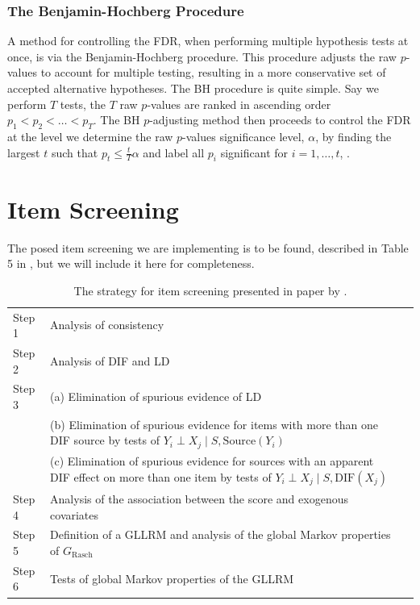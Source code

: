 \documentclass[a4project,12pt]{article}
\theoremstyle{examplestyle}
\theoremstyle{defstyle}
\theoremstyle{thmstyle}
\begin{document}
\subsubsection{The Benjamin-Hochberg Procedure}
A method for controlling the FDR, when performing multiple hypothesis tests at once, is via the Benjamin-Hochberg procedure. This procedure adjusts the raw $p$-values to account for multiple testing, resulting in a more conservative set of accepted alternative hypotheses. The BH procedure is quite simple. Say we perform $T$ tests, the $T$ raw $p$-values are ranked in ascending order $p_1<p_2<\dots <p_T$. The BH $p$-adjusting method then proceeds to control the FDR at the level we determine the raw $p$-values significance level, $\alpha$, by finding the largest $t$ such that $p_t\leq \frac{t}{T}\alpha$ and label all $p_i$ significant for $i=1,\dots,t$, \cite{benjamini-hochberg-1995}.


\section{Item Screening}\label{sec:it_sec}
The posed item screening we are implementing is to be found, described in Table 5 in \cite{kreiner-christensen-2011}, but we will include it here for completeness.

\begin{table}[ht]
\centering
\renewcommand{\arraystretch}{1.3}
\begin{tabular}{@{}p{1.5cm}p{11cm}p{3cm}@{}}
\toprule
Step 1 &
Analysis of consistency \\
Step 2 &
Analysis of DIF and LD  \\
Step 3 &
(a) Elimination of spurious evidence of LD \\
&
(b) Elimination of spurious evidence for items with more than one
DIF source by tests of
$Y_i \perp X_j \mid S,\mathrm{Source}(Y_i)$ \\
&
(c) Elimination of spurious evidence for sources with an apparent
DIF effect on more than one item by tests of
$Y_i \perp X_j \mid S,\mathrm{DIF}(X_j)$ \\
Step 4 &
Analysis of the association between the score and exogenous covariates \\
Step 5 &
Definition of a GLLRM and analysis of the global Markov properties
of $G_{\mathrm{Rasch}}$\\
Step 6 &
Tests of global Markov properties of the GLLRM \\
\bottomrule
\end{tabular}
\caption{The strategy for item screening presented in paper by \cite{kreiner-christensen-2011}.}
\label{tab:item_screening_guide}
\end{table}
\end{document}
